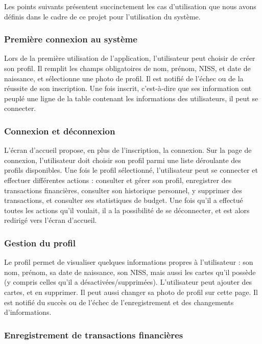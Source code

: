 \documentclass[a4paper,12pt]{article}
\begin{document}
Les points suivants présentent succinctement les cas d'utilisation que nous avons définis dans le cadre de ce projet pour l'utilisation du système.

\subsubsection{Première connexion au système}

Lors de la première utilisation de l'application, l'utilisateur peut choisir de créer son profil.
Il remplit les champs obligatoires de nom, prénom, NISS, et date de naissance, et sélectionne une photo de profil.
Il est notifié de l'échec ou de la réussite de son inscription.
Une fois inscrit, c'est-à-dire que ses information ont peuplé une ligne de la table contenant les informations des utilisateurs, il peut se connecter.

\subsubsection{Connexion et déconnexion}

L'écran d'accueil propose, en plus de l'inscription, la connexion.
Sur la page de connexion, l'utilisateur doit choisir son profil parmi une liste déroulante des profils disponibles.
Une fois le profil sélectionné, l'utilisateur peut se connecter et effectuer différentes actions : consulter et gérer son profil, enregistrer des transactions financières, consulter son historique personnel, y supprimer des transactions, et consulter ses statistiques de budget.
Une fois qu'il a effectué toutes les actions qu'il voulait, il a la possibilité de se déconnecter, et est alors redirigé vers l'écran d'accueil.

\subsubsection{Gestion du profil}

Le profil permet de visualiser quelques informations propres à l'utilisateur : son nom, prénom, sa date de naissance, son NISS, mais aussi les cartes qu'il possède (y compris celles qu'il a désactivées/supprimées).
L'utilisateur peut ajouter des cartes, et en supprimer.
Il peut aussi changer sa photo de profil sur cette page.
Il est notifié du succès ou de l'échec de l'enregistrement et des changements d'informations.

\subsubsection{Enregistrement de transactions financières}
\end{document}
